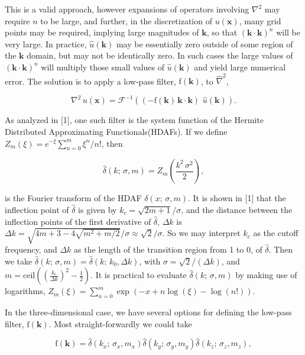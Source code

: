 \documentclass[amsmath,amssymb,floatfix]{revtex4}
\numberwithin{equation}{section}
\begin{document}
This is a valid approach, however expansions of operators involving $\nabla^2$ may require $n$ to be large, and further, in the discretization of $u(\mathbf{x})$, many grid points may be required, implying large magnitudes of $\mathbf{k}$, so that $( \mathbf{k} \cdot \mathbf{k} )^n$ will be very large. In practice, $\hat{u}(\mathbf{k})$ may be essentially zero outside of some region of the $\mathbf{k}$ domain, but may not be identically zero. In such cases the large values of $( \mathbf{k} \cdot \mathbf{k} )^n$ will multiply those small values of $\hat{u}(\mathbf{k})$ and yield large numerical error. The solution is to apply a low-pass filter, $\textrm{f}(\mathbf{k})$, to $\hat{\nabla}^{2}$,

\begin{equation}
\nabla^2 \, u(\mathbf{x}) = \mathcal{F}^{-1} (  ( - \textrm{f}(\mathbf{k}) \, \mathbf{k} \cdot \mathbf{k}) \, \, \hat{u}(\mathbf{k}) ).
\end{equation}

As analyzed in [1], one such filter is the system function of the Hermite Distributed Approximating Functionals(HDAFs). If we define $Z_m(\xi ) = e^{- \xi}\sum_{n=0}^m \xi^n/n!$, then 

\begin{equation}
\hat{\delta} (k; \, \sigma, m) = Z_m \left( \frac{k^2 \, \sigma^2}{2} \right),
\end{equation}

is the Fourier transform of the HDAF ${\delta} (x; \, \sigma, m)$. It is shown in [1] that the inflection point of $\hat{\delta}$ is given by $k_c = \sqrt{2m+1}/\sigma$, and the distance between the inflection points of the first derivative of $\hat{\delta}$, $\Delta k$ is $\Delta k = \sqrt{4m+3-4 \sqrt{m^2+m/2}}/\sigma \approx \sqrt{2}/\sigma$. So we may interpret $k_c$ as the cutoff frequency, and $\Delta k$ as the length of the transition region from 1 to 0, of $\hat{\delta}$. Then we take $\hat{\delta} (k; \, \sigma, m) = \hat{\delta} (k; \, k_0, \Delta k)$, with $\sigma = \sqrt{2}/(\Delta k)$, and $m = \textrm{ceil}{ \left( \left( \frac{k_c}{\Delta k} \right)^2  - \frac{1}{2} \right) }$. It is practical to evaluate $\hat{\delta} (k; \, \sigma, m)$ by making use of logarithms, $Z_m(\xi ) = \sum_{n=0}^m \exp \left( -x + n \log (\xi) - \log(n!) \right)$.

In the three-dimensional case, we have several options for defining the low-pass filter, $\textrm{f}(\mathbf{k})$. Most straight-forwardly we could take

\begin{equation}
\textrm{f}(\mathbf{k}) = \hat{\delta} (k_x; \, \sigma_x, m_x)\hat{\delta} (k_y; \, \sigma_y, m_y)\hat{\delta} (k_z; \, \sigma_z, m_z),
\end{equation}
\end{document}
